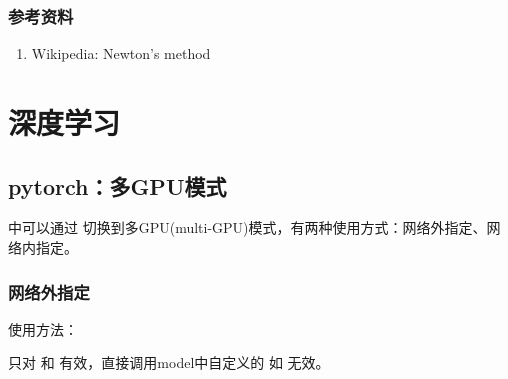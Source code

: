 \documentclass[letterpaper,10pt,english]{sphinxmanual}
\begin{document}
\subsection{参考资料}
\label{\detokenize{machineLearning/05_newton:id6}}\begin{enumerate}
\item {} 
Wikipedia: Newton’s method

\end{enumerate}
\begin{quote}

\end{quote}


\chapter{深度学习}
\label{\detokenize{deepLearning/index::doc}}\label{\detokenize{deepLearning/index:id1}}

\section{pytorch：多GPU模式}
\label{\detokenize{deepLearning/01_dataParallel::doc}}\label{\detokenize{deepLearning/01_dataParallel:pytorch-gpu}}
 中可以通过  切换到多GPU(multi-GPU)模式，有两种使用方式：网络外指定、网络内指定。


\subsection{网络外指定}
\label{\detokenize{deepLearning/01_dataParallel:id1}}
使用方法：

%
\begin{sphinxVerbatim}[commandchars=\\\{\},numbers=left,firstnumber=1,stepnumber=1]
   \PYG{p}{[}  \PYG{p}{]}
\end{sphinxVerbatim}

 只对   和  有效，直接调用model中自定义的   如  无效。
\end{document}
